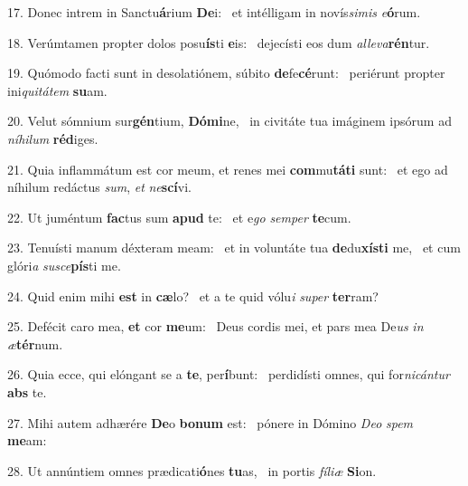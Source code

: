 17. Donec intrem in Sanctu\textbf{á}rium \textbf{De}i: \ast\  et intélligam in novís\textit{si}\textit{mis} \textit{e}\textbf{ó}rum.\

18. Verúmtamen propter dolos posu\textbf{ís}ti \textbf{e}is: \ast\  dejecísti eos dum \textit{al}\textit{le}\textit{va}\textbf{rén}tur.\

19. Quómodo facti sunt in desolatiónem, súbito \textbf{de}fe\textbf{cé}runt: \ast\  periérunt propter ini\textit{qui}\textit{tá}\textit{tem} \textbf{su}am.\

20. Velut sómnium sur\textbf{gén}tium, \textbf{Dó}\textbf{mi}ne, \ast\  in civitáte tua imáginem ipsórum ad \textit{ní}\textit{hi}\textit{lum} \textbf{réd}iges.\

21. Quia inflammátum est cor meum, et renes mei \textbf{com}mu\textbf{tá}\textbf{ti} sunt: \ast\  et ego ad níhilum redáctus \textit{sum}, \textit{et} \textit{ne}\textbf{scí}vi.\

22. Ut juméntum \textbf{fac}tus sum \textbf{a}\textbf{pud} te: \ast\  et e\textit{go} \textit{sem}\textit{per} \textbf{te}cum.\

23. Tenuísti manum déxteram meam: \dag\  et in voluntáte tua \textbf{de}du\textbf{xís}\textbf{ti} me, \ast\  et cum glóri\textit{a} \textit{su}\textit{sce}\textbf{pís}ti me.\

24. Quid enim mihi \textbf{est} in \textbf{cæ}lo? \ast\  et a te quid vólu\textit{i} \textit{su}\textit{per} \textbf{ter}ram?\

25. Defécit caro mea, \textbf{et} cor \textbf{me}um: \ast\  Deus cordis mei, et pars mea De\textit{us} \textit{in} \textit{æ}\textbf{tér}num.\

26. Quia ecce, qui elóngant se a \textbf{te}, per\textbf{í}bunt: \ast\  perdidísti omnes, qui for\textit{ni}\textit{cán}\textit{tur} \textbf{abs} te.\

27. Mihi autem adhærére \textbf{De}o \textbf{bo}\textbf{num} est: \ast\  pónere in Dómino \textit{De}\textit{o} \textit{spem} \textbf{me}am:\

28. Ut annúntiem omnes prædicati\textbf{ó}nes \textbf{tu}as, \ast\  in portis \textit{fí}\textit{li}\textit{æ} \textbf{Si}on.\

